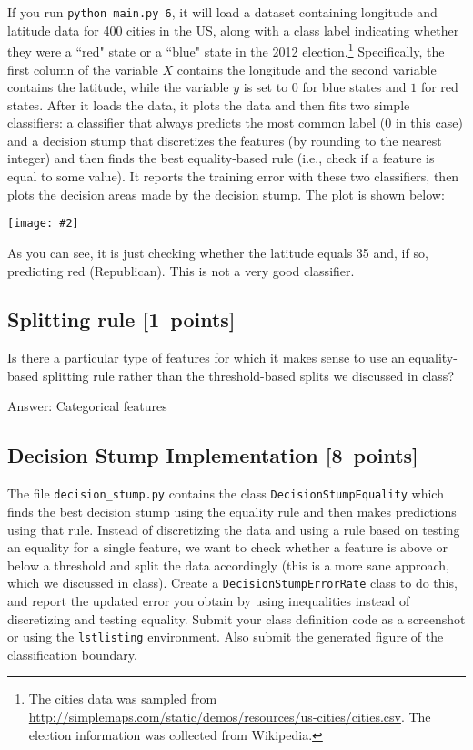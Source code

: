 \documentclass{article}
\newcommand{\blu}[1]{{\textcolor{blu}{#1}}}
\newenvironment{answer}{\par\begingroup\color{gre}Answer: }{\endgroup}
\let\ask\blu
\newcommand\pts[1]{\textcolor{pointscolour}{[#1~points]}}
\newcommand{\centerfig}[2]{\begin{center}\texttt{[image: \#2]}\end{center}}
\begin{document}
  If you run \texttt{python main.py 6}, it will load a dataset containing longitude
  and latitude data for 400 cities in the US, along with a class label indicating
  whether they were a ``red" state or a ``blue" state in the 2012
  election.\footnote{The cities data was sampled from \url{http://simplemaps.com/static/demos/resources/us-cities/cities.csv}. The election information was collected from Wikipedia.}
  Specifically, the first column of the variable $X$ contains the
  longitude and the second variable contains the latitude,
  while the variable $y$ is set to $0$ for blue states and $1$ for red states.
  After it loads the data, it plots the data and then fits two simple
  classifiers: a classifier that always predicts the
  most common label ($0$ in this case) and a decision stump
  that discretizes the features (by rounding to the nearest integer)
  and then finds the best equality-based rule (i.e., check
  if a feature is equal to some value).
  It reports the training error with these two classifiers, then plots the decision areas made by the decision stump.
  The plot is shown below:

  \centerfig{0.7}{./figs/q6_decisionBoundary}

  As you can see, it is just checking whether the latitude equals 35 and, if so, predicting red (Republican).
  This is not a very good classifier.

  \subsection{Splitting rule \pts{1}}

  Is there a particular type of features for which it makes sense to use an equality-based splitting rule rather than the threshold-based splits we discussed in class?
  \begin{answer}
    Categorical features
  \end{answer}


  \subsection{Decision Stump Implementation \pts{8}}\label{sec6.2}

  The file \texttt{decision\string_stump.py} contains the class \texttt{DecisionStumpEquality} which
  finds the best decision stump using the equality rule and then makes predictions using that
  rule. Instead of discretizing the data and using a rule based on testing an equality for
  a single feature, we want to check whether a feature is above or below a threshold and
  split the data accordingly (this is a more sane approach, which we discussed in class).
  \ask{Create a \texttt{DecisionStumpErrorRate} class to do this, and report the updated error you
  obtain by using inequalities instead of discretizing and testing equality.
  Submit your class definition code as a screenshot or using the \texttt{lstlisting} environment.
  Also submit the generated figure of the classification boundary.}
\end{document}
